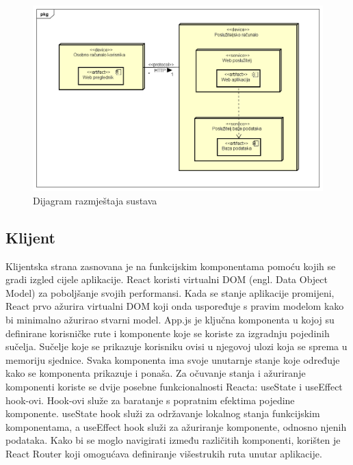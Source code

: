 \begin{figure}[H]
					\includegraphics[width=\textwidth]{slike/DeploymentDiagram.png} 
					\centering
					\caption{Dijagram razmještaja sustava}
					\label{fig:promjene}
				\end{figure}
\subsection{Klijent}
Klijentska strana  zasnovana je na funkcijskim komponentama pomoću kojih se gradi izgled cijele aplikacije. React koristi virtualni DOM (engl. Data Object Model) za poboljšanje svojih performansi. Kada se stanje aplikacije promijeni, React prvo ažurira virtualni DOM koji onda uspoređuje s pravim modelom kako bi minimalno ažurirao stvarni model. App.js je ključna komponenta u kojoj su definirane korisničke rute i komponente koje se koriste za izgradnju pojedinih sučelja. Sučelje koje se prikazuje korisniku ovisi u njegovoj ulozi koja se sprema u memoriju sjednice. Svaka komponenta ima svoje unutarnje stanje koje određuje kako se komponenta prikazuje i ponaša. Za očuvanje stanja i ažuriranje komponenti koriste se dvije posebne funkcionalnosti Reacta: useState i useEffect hook-ovi. Hook-ovi služe za baratanje s popratnim efektima pojedine komponente. useState hook služi za održavanje lokalnog stanja funkcijskim komponentama, a useEffect hook služi za ažuriranje komponente, odnosno njenih podataka. Kako bi se moglo navigirati između različitih komponenti, korišten je React Router koji omogućava definiranje višestrukih ruta unutar aplikacije.

